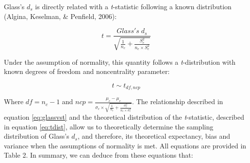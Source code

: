 \documentclass[
  man,floatsintext]{apa6}
\begin{document}
Glass's \(d_{s}\) is directly related with a \emph{t}-statistic following a known distribution (Algina, Keselman, \& Penfield, 2006):

\begin{equation} 
t = \frac{Glass's \; d_s}{\sqrt{\frac{1}{n_{c}}+\frac{S_{e}^2}{n_{e} \times S^2_{c}}}}
\label{eq:glassvst}
\end{equation}

Under the assumption of normality, this quantity follows a \emph{t}-distribution with known degrees of freedom and noncentrality parameter:

\begin{equation} 
t \sim t_{df,ncp}
\label{eq:tdist}
\end{equation}

Where \(df = n_{c}-1\) and \(ncp = \frac{\mu_{c}-\mu_{e}}{\sigma_{c} \times \sqrt{\frac{1}{n_{c}} + \frac{\sigma_{e}^2}{n_{e} \times \sigma^2_{c}}}}.\) The relationship described in equation \ref{eq:glassvst} and the theoretical distribution of the \emph{t}-statistic, described in equation \ref{eq:tdist}, allow us to theoretically determine the sampling distribution of Glass's \(d_s\), and therefore, its theoretical expectancy, bias and variance when the assumptions of normality is met. All equations are provided in Table 2. In summary, we can deduce from these equations that:
\end{document}
